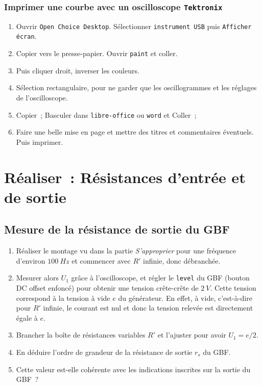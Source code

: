 \documentclass[a4paper, 11pt, final, garamond]{book}
\begin{document}
\subsubsection{Imprimer une courbe avec un oscilloscope \texttt{Tektronix}}

\begin{enumerate}
    \item Ouvrir \texttt{Open Choice Desktop}. Sélectionner \texttt{instrument
        USB} puis \texttt{Afficher écran}.
    \item Copier vers le presse-papier. Ouvrir \texttt{paint} et coller.
    \item Puis cliquer droit, inverser les couleurs.
    \item Sélection rectangulaire, pour ne garder que les oscillogrammes et les
        réglages de l'oscilloscope.
    \item Copier~; Basculer dans \texttt{libre-office} ou \texttt{word} et
        Coller~;
    \item Faire une belle mise en page et mettre des titres et commentaires
        éventuels. Puis imprimer.
\end{enumerate}

\section{Réaliser~: Résistances d'entrée et de sortie}
\subsection{Mesure de la résistance de sortie du GBF}

\begin{enumerate}
    \item Réaliser le montage vu dans la partie \textit{S'approprier} pour une
        fréquence d'environ $\SI{100}{Hz}$ et commencer avec $R'$ infinie, donc
        débranchée.
    \item Mesurer alors $U_1$ grâce à l'oscilloscope, et régler le
        \texttt{level} du GBF (bouton DC offset enfoncé) pour obtenir une
        tension crête-crête de $\SI{2}{V}$. Cette tension correspond à la
        tension à vide $e$ du générateur. En effet, à vide, c'est-à-dire pour
        $R'$ infinie, le courant est nul et donc la tension relevée est
        directement égale à $e$.
    \item Brancher la boîte de résistances variables $R'$ et l'ajuster pour
        avoir $U_1 = e/2$.
    \item En déduire l'ordre de grandeur de la résistance de sortie $r_{s}$ du
        GBF.
    \item Cette valeur est-elle cohérente avec les indications inscrites sur la
        sortie du GBF~?
\end{enumerate}
\end{document}
